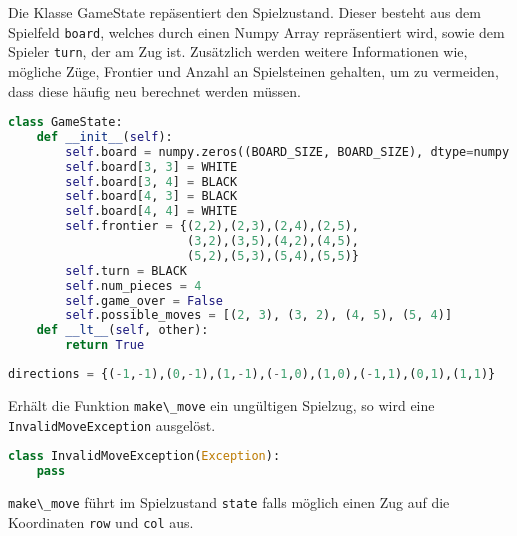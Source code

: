 Die Klasse GameState repäsentiert den Spielzustand. Dieser besteht aus
dem Spielfeld \passthrough{\lstinline!board!}, welches durch einen Numpy
Array repräsentiert wird, sowie dem Spieler
\passthrough{\lstinline!turn!}, der am Zug ist. Zusätzlich werden
weitere Informationen wie, mögliche Züge, Frontier und Anzahl an
Spielsteinen gehalten, um zu vermeiden, dass diese häufig neu berechnet
werden müssen.

\begin{lstlisting}[language=Python]
class GameState:
    def __init__(self):
        self.board = numpy.zeros((BOARD_SIZE, BOARD_SIZE), dtype=numpy.int8)
        self.board[3, 3] = WHITE
        self.board[3, 4] = BLACK
        self.board[4, 3] = BLACK
        self.board[4, 4] = WHITE
        self.frontier = {(2,2),(2,3),(2,4),(2,5),
                         (3,2),(3,5),(4,2),(4,5),
                         (5,2),(5,3),(5,4),(5,5)}
        self.turn = BLACK
        self.num_pieces = 4
        self.game_over = False
        self.possible_moves = [(2, 3), (3, 2), (4, 5), (5, 4)]
    def __lt__(self, other):
        return True
\end{lstlisting}

\begin{lstlisting}[language=Python]
directions = {(-1,-1),(0,-1),(1,-1),(-1,0),(1,0),(-1,1),(0,1),(1,1)}
\end{lstlisting}

Erhält die Funktion \passthrough{\lstinline!make\_move!} ein ungültigen
Spielzug, so wird eine \passthrough{\lstinline!InvalidMoveException!}
ausgelöst.

\begin{lstlisting}[language=Python]
class InvalidMoveException(Exception):
    pass
\end{lstlisting}

\passthrough{\lstinline!make\_move!} führt im Spielzustand
\passthrough{\lstinline!state!} falls möglich einen Zug auf die
Koordinaten \passthrough{\lstinline!row!} und
\passthrough{\lstinline!col!} aus.

